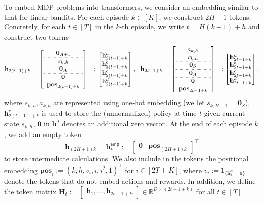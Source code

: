 \documentclass[10pt]{article}
\newcommand{\<}{\left\langle}
\renewcommand{\>}{\right\rangle}
\newcommand{\bzero}{{\mathbf 0}}
\newcommand{\bone}{{\mathbf 1}}
\newcommand{\R}{\mathbb{R}}
\newcommand{\posv}{{\mathbf{pos}}}
\newcommand{\parta}{{a}}
\newcommand{\partb}{{b}}
\newcommand{\partc}{{c}}
\newcommand{\partd}{{d}}
\newcommand{\state}{{s}}
\newcommand{\action}{{a}}
\newcommand{\reward}{{r}}
\newcommand{\totlen}{{T}}
\newcommand{\Numepi}{{K}}
\newcommand{\horizon}{{H}}
\renewcommand{\horizon}{{H}}
\newcommand{\Numst}{{S}}
\newcommand{\Numact}{{A}}
\newcommand{\oddeven}{{v}}
\newcommand{\emp}{{\mathsf{emp}}}
\def\bH{{\mathbf H}}
\def\bh{{\mathbf h}}
\begin{document}
To embed MDP problems into transformers, we consider an embedding similar to that for linear bandits. For each episode $k\in[\Numepi]$, we construct $2\horizon+1$ tokens. Concretely, for each $t\in[\totlen]$ in the $k$-th episode, we write  $t=\horizon(k-1)+h$  and construct two tokens
\[
\begin{aligned}
\bh_{2(t-1)+k}=
\left[
\begin{array}{cc}
     \bzero_{\Numact+1} \\
     \hdashline 
     \state_{k,h}\\  
      \hdashline 
    \bzero_{\Numact}\\  
    \hdashline  
    \bzero\\
    \posv_{2(t-1)+k}
\end{array}\right]
=:
\begin{bmatrix}
     \bh_{2(t-1)+k}^{\parta} \\  \bh_{2(t-1)+k}^{\partb}\\  \bh_{2(t-1)+k}^{\partc}\\   \bh_{2(t-1)+k}^{\partd}\\
\end{bmatrix},~~
\bh_{2t-1+k}=
\left[
\begin{array}{cc}
     \action_{k,h} \\
      \reward_{k,h}\\  
      \hdashline 
      \bzero_{\Numst}\\ 
      \hdashline 
      \bzero_{\Numact}\\ 
     \hdashline  
      \bzero\\ 
      \posv_{2t-1+k}
\end{array}\right]=:
\begin{bmatrix}
    \bh_{2t-1+k}^{\parta} \\  \bh_{2t-1+k}^{\partb}\\   \bh_{2t-1+k}^{\partc}\\   \bh_{2t-1+k}^{\partd}
\end{bmatrix},
\end{aligned}
\]
where  $\state_{k,h},\action_{k,h}$ are represented using one-hot embedding (we let $\state_{k,\horizon+1}=\bzero_\Numst$), $\bh^\partc_{2(t-1)+k}$ is used to store the (unnormalized)  policy at time  $t$ given current state $\state_{k,h}$, $\bzero$ in $\bh^\partd$ denotes an additional zero vector. At the end of each episode $k$, we add an empty token 
$$
\bh_{(2\horizon+1)k}=\bh^{\emp}_{k}:=\begin{bmatrix}
    \bzero &\posv_{(2\horizon+1)k}
\end{bmatrix}^\top
$$ to store intermediate calculations. We also include in the tokens  the positional embedding $\posv_i:=(k,h,v_i,i,i^2,1)^\top$ for $i\in[2\totlen+\Numepi]$, where $\oddeven_i:=\bone_{\{\bh_i^\parta=\bzero\}}$  denote the tokens that do not embed actions and rewards.    In addition, we define  the token matrix $\bH_t:=\begin{bmatrix}
    \bh_1,\ldots,\bh_{2t-1+k}
\end{bmatrix}\in\R^{D\times (2t-1+k)}$ for all $t\in[\totlen]$.
\end{document}
